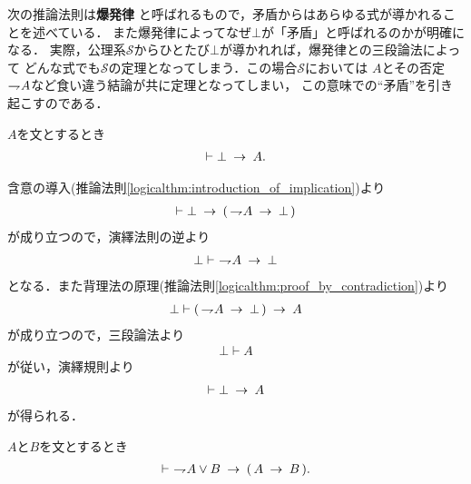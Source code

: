 	次の推論法則は{\bf 爆発律}
	と呼ばれるもので，矛盾からはあらゆる式が導かれることを述べている．
	また爆発律によってなぜ$\bot$が「矛盾」と呼ばれるのかが明確になる．
	実際，公理系$\mathscr{S}$からひとたび$\bot$が導かれれば，爆発律との三段論法によって
	どんな式でも$\mathscr{S}$の定理となってしまう．この場合$\mathscr{S}$においては
	$A$とその否定$\rightharpoondown\hspace{-0.25em} A$など食い違う結論が共に定理となってしまい，
	この意味での``矛盾''を引き起こすのである．
	
	\begin{screen}
		\begin{logicalthm}[爆発律]
		\label{logicalthm:principle_of_explosion}
			$A$を文とするとき
			\begin{align}
				\vdash \bot \hspace{0.25em}\rightarrow\hspace{0.25em} A.
			\end{align}
		\end{logicalthm}
	\end{screen}
	
	\begin{prf}
		含意の導入(推論法則\ref{logicalthm:introduction_of_implication})より
		\begin{align}
			\vdash \bot \hspace{0.25em}\rightarrow\hspace{0.25em} (\, \rightharpoondown\hspace{-0.25em} A \hspace{0.25em}\rightarrow\hspace{0.25em} \bot\, )
		\end{align}
		が成り立つので，演繹法則の逆より
		\begin{align}
			\bot \vdash\ \rightharpoondown\hspace{-0.25em} A \hspace{0.25em}\rightarrow\hspace{0.25em} \bot
		\end{align}
		となる．また背理法の原理(推論法則\ref{logicalthm:proof_by_contradiction})より
		\begin{align}
			\bot \vdash (\, \rightharpoondown\hspace{-0.25em} A \hspace{0.25em}\rightarrow\hspace{0.25em} \bot\, ) \hspace{0.25em}\rightarrow\hspace{0.25em} A
		\end{align}
		が成り立つので，三段論法より
		\begin{align}
			\bot \vdash A
		\end{align}
		が従い，演繹規則より
		\begin{align}
			\vdash \bot \hspace{0.25em}\rightarrow\hspace{0.25em} A
		\end{align}
		が得られる．
		\QED
	\end{prf}
	
	\begin{screen}
		\begin{logicalthm}[否定の論理和は含意で書ける]
		\label{logicalthm:disjunction_of_negation_rewritable_by_implication}
			$A$と$B$を文とするとき
			\begin{align}
				\vdash\ \rightharpoondown\hspace{-0.25em} A \vee B \hspace{0.25em}\rightarrow\hspace{0.25em} (\, A \hspace{0.25em}\rightarrow\hspace{0.25em} B\, ).
			\end{align}
		\end{logicalthm}
	\end{screen}
	
